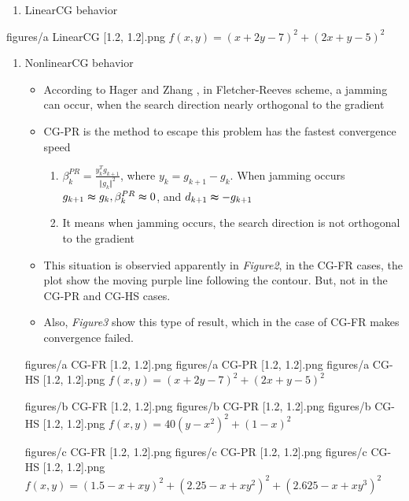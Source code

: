 \documentclass{standalone}
\begin{document}
\begin{enumerate}
  \item LinearCG behavior
\end{enumerate}

\insertfiguresone
{figures/a LinearCG [1.2, 1.2].png}
{$f(x, y)=(x+2y-7)^2 + (2x+y-5)^2$}

\begin{enumerate}[resume]
  \item NonlinearCG behavior
  \begin{itemize}
    \item According to Hager and Zhang \cite{hager2006algorithm}, in Fletcher-Reeves scheme, 
    a jamming can occur, when the search direction nearly orthogonal to the gradient
    \item CG-PR is the method to escape this problem has the fastest convergence speed
    \begin{enumerate}
      \item $ \beta_k^{PR} = \frac{y_k^Tg_{k+1}}{ {\Vert g_k \Vert}^2 } $, where $y_k = g_{k+1} - g_{k}$. When jamming occurs 
      $g_{k+1} \thickapprox g_k, \beta_k^{PR} \thickapprox 0$, and $d_{k+1} \thickapprox -g_{k+1}$
      \item It means when jamming occurs, the search direction is not orthogonal to the gradient
    \end{enumerate}
    \item This situation is observied apparently in \emph{Figure2}, in the CG-FR cases, the plot show the moving purple line following the contour.
    But, not in the CG-PR and CG-HS cases.
    \item Also, \emph{Figure3} show this type of result, which in the case of CG-FR makes convergence failed.
  \end{itemize}

\insertfiguresthree
{figures/a CG-FR [1.2, 1.2].png}
{figures/a CG-PR [1.2, 1.2].png}
{figures/a CG-HS [1.2, 1.2].png}
{$f(x, y)=(x+2y-7)^2 + (2x+y-5)^2$}

\insertfiguresthree
{figures/b CG-FR [1.2, 1.2].png}
{figures/b CG-PR [1.2, 1.2].png}
{figures/b CG-HS [1.2, 1.2].png}
{$f(x, y)=40(y-x^2)^2 + (1-x)^2$}

\insertfiguresthree
{figures/c CG-FR [1.2, 1.2].png}
{figures/c CG-PR [1.2, 1.2].png}
{figures/c CG-HS [1.2, 1.2].png}
{$f(x, y)=(1.5-x+xy)^2 + (2.25-x+xy^2)^2+(2.625-x+xy^3)^2$}
\end{enumerate}
\end{document}
